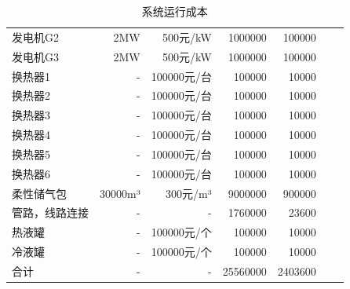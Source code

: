\documentclass{jnuthesis}
\begin{document}
\begin{table}[H]
{\begin{tabular}{|l|r|r|r|r|c|c|}
				发电机G2   & 2MW     & 500元/kW   & 1000000  & 100000  &  &  \\ \cline{1-5}
				发电机G3   & 2MW     & 500元/kW   & 1000000  & 100000  &  &  \\ \cline{1-5}
				换热器1    & -       & 100000元/台 & 100000   & 10000   &  &  \\ \cline{1-5}
				换热器2    & -       & 100000元/台 & 100000   & 10000   &  &  \\ \cline{1-5}
				换热器3    & -       & 100000元/台 & 100000   & 10000   &  &  \\ \cline{1-5}
				换热器4    & -       & 100000元/台 & 100000   & 10000   &  &  \\ \cline{1-5}
				换热器5    & -       & 100000元/台 & 100000   & 10000   &  &  \\ \cline{1-5}
				换热器6    & -       & 100000元/台 & 100000   & 10000   &  &  \\ \cline{1-5}
				柔性储气包   & 30000m³ & 300元/m³   & 9000000  & 900000  &  &  \\ \cline{1-5}
				管路，线路连接 & -       & -         & 1760000  & 23600   &  &  \\ \cline{1-5}
				热液罐     & -       & 100000元/个 & 100000   & 10000   &  &  \\ \cline{1-5}
				冷液罐     & -       & 100000元/个 & 100000   & 10000   &  &  \\ \cline{1-5}
				合计      & -       & -         & 25560000 & 2403600 &  &  \\ \hline
			\end{tabular}
		}
		\caption{\fontsize{10.5bp}{10pt}系统运行成本}
		\label{tab:my-table5}
	\end{table}
\end{document}
